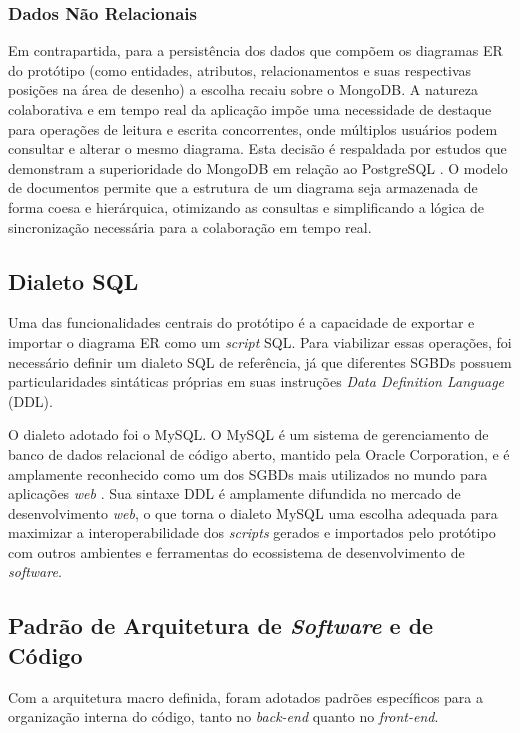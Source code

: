 \subsubsection[Dados Não Relacionais]{Dados Não Relacionais}
%
%
Em contrapartida, para a persistência dos dados que compõem os diagramas ER do protótipo (como entidades, atributos, relacionamentos e suas respectivas posições na área de desenho) a escolha recaiu sobre o MongoDB. A natureza colaborativa e em tempo real da aplicação impõe uma necessidade de destaque para operações de leitura e escrita concorrentes, onde múltiplos usuários podem consultar e alterar o mesmo diagrama. Esta decisão é respaldada por estudos que demonstram a superioridade do MongoDB em relação ao PostgreSQL \cite{Politowski2014}. O modelo de documentos permite que a estrutura de um diagrama seja armazenada de forma coesa e hierárquica, otimizando as consultas e simplificando a lógica de sincronização necessária para a colaboração em tempo real.

\subsection[Dialeto SQL]{Dialeto SQL}

Uma das funcionalidades centrais do protótipo é a capacidade de exportar e importar o diagrama ER como um \textit{script} SQL. Para viabilizar essas operações, foi necessário definir um dialeto SQL de referência, já que diferentes SGBDs possuem particularidades sintáticas próprias em suas instruções \textit{Data Definition Language} (DDL).

O dialeto adotado foi o MySQL. O MySQL é um sistema de gerenciamento de banco de dados relacional de código aberto, mantido pela Oracle Corporation, e é amplamente reconhecido como um dos SGBDs mais utilizados no mundo para aplicações \textit{web} \cite{OracleMySQL2024}. Sua sintaxe DDL é amplamente difundida no mercado de desenvolvimento \textit{web}, o que torna o dialeto MySQL uma escolha adequada para maximizar a interoperabilidade dos \textit{scripts} gerados e importados pelo protótipo com outros ambientes e ferramentas do ecossistema de desenvolvimento de \textit{software}.

\subsection[Padrão de Arquitetura de \textit{Software} e de Código]{Padrão de Arquitetura de \textit{Software} e de Código}
Com a arquitetura macro definida, foram adotados padrões específicos para a organização interna do código, tanto no \textit{back-end} quanto no \textit{front-end}.

